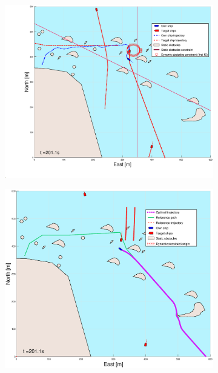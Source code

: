 \begin{figure}[ht]
\begin{subfigure}[b]{0.499\textwidth}
    \end{subfigure}
    \hfill
    \\
    \begin{subfigure}[b]{0.49\textwidth}
        \centering
        \includegraphics[width=\textwidth]{Images/Figures/skjergard_m_trafikk_NEW/_Simple_0fig1_time=201}
    \end{subfigure}
    \hfill
    \begin{subfigure}[b]{0.499\textwidth}
        \centering
        \includegraphics[width=\textwidth]{Images/Figures/skjergard_m_trafikk_NEW/_Simple_0fig999_time=201}

\end{subfigure}
\end{figure}
